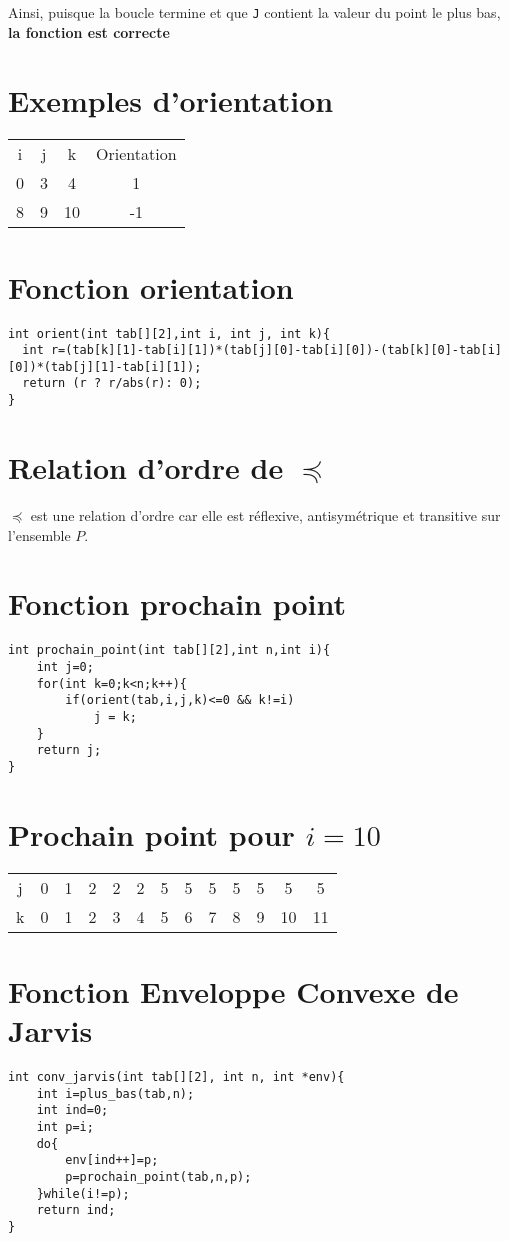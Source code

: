 \documentclass{article}
\begin{document}
Ainsi, puisque la boucle termine et que \texttt{J} contient la valeur du point le plus bas, \textbf{la fonction est correcte}

\section{Exemples d'orientation}
\begin{center}
\begin{tabular}{ c c c c }
    i & j & k & Orientation \\ 
    0 & 3 & 4 & 1\\  
    8 & 9 & 10 & -1    
\end{tabular}
\end{center}
\section{Fonction orientation}
\begin{verbatim}
int orient(int tab[][2],int i, int j, int k){
  int r=(tab[k][1]-tab[i][1])*(tab[j][0]-tab[i][0])-(tab[k][0]-tab[i][0])*(tab[j][1]-tab[i][1]);
  return (r ? r/abs(r): 0);
}
\end{verbatim}
\section{Relation d'ordre de $\preceq$}
$\preceq$ est une relation d'ordre car elle est réflexive, antisymétrique et transitive sur l'ensemble $P$.

\section{Fonction prochain point}
\begin{verbatim}
int prochain_point(int tab[][2],int n,int i){
    int j=0;
    for(int k=0;k<n;k++){
        if(orient(tab,i,j,k)<=0 && k!=i)
            j = k;
    }
    return j;
}
\end{verbatim}
\section{Prochain point pour $i=10$}
\begin{tabular}{c c  c  c  c  c  c  c  c  c  c  c  c}    
j & 0 & 1 & 2 & 2 & 2 & 5 & 5 & 5 & 5 & 5 & 5 & 5 \\
k & 0 & 1 & 2 & 3 & 4 & 5 & 6 & 7 & 8 & 9 & 10 & 11 \\
\end{tabular}
\section{Fonction Enveloppe Convexe de Jarvis}
\begin{verbatim}
int conv_jarvis(int tab[][2], int n, int *env){
    int i=plus_bas(tab,n);
    int ind=0;
    int p=i;
    do{
        env[ind++]=p;
        p=prochain_point(tab,n,p);
    }while(i!=p);
    return ind;
}
\end{verbatim}
\end{document}

